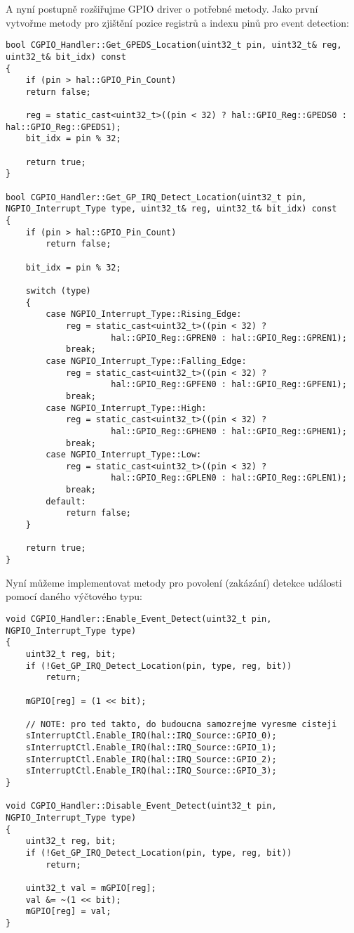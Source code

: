 \documentclass{article}
\begin{document}
A nyní postupně rozšiřujme GPIO driver o potřebné metody. Jako první vytvořme metody pro zjištění pozice registrů a indexu pinů pro event detection:
\begin{lstlisting}
bool CGPIO_Handler::Get_GPEDS_Location(uint32_t pin, uint32_t& reg, uint32_t& bit_idx) const
{
	if (pin > hal::GPIO_Pin_Count)
	return false;
	
	reg = static_cast<uint32_t>((pin < 32) ? hal::GPIO_Reg::GPEDS0 : hal::GPIO_Reg::GPEDS1);
	bit_idx = pin % 32;
	
	return true;
}

bool CGPIO_Handler::Get_GP_IRQ_Detect_Location(uint32_t pin, NGPIO_Interrupt_Type type, uint32_t& reg, uint32_t& bit_idx) const
{
	if (pin > hal::GPIO_Pin_Count)
		return false;
	
	bit_idx = pin % 32;
	
	switch (type)
	{
		case NGPIO_Interrupt_Type::Rising_Edge:
			reg = static_cast<uint32_t>((pin < 32) ?
					 hal::GPIO_Reg::GPREN0 : hal::GPIO_Reg::GPREN1);
			break;
		case NGPIO_Interrupt_Type::Falling_Edge:
			reg = static_cast<uint32_t>((pin < 32) ?
					 hal::GPIO_Reg::GPFEN0 : hal::GPIO_Reg::GPFEN1);
			break;
		case NGPIO_Interrupt_Type::High:
			reg = static_cast<uint32_t>((pin < 32) ?
					 hal::GPIO_Reg::GPHEN0 : hal::GPIO_Reg::GPHEN1);
			break;
		case NGPIO_Interrupt_Type::Low:
			reg = static_cast<uint32_t>((pin < 32) ?
					 hal::GPIO_Reg::GPLEN0 : hal::GPIO_Reg::GPLEN1);
			break;
		default:
			return false;
	}
	
	return true;
}
\end{lstlisting}

Nyní můžeme implementovat metody pro povolení (zakázání) detekce události pomocí daného výčtového typu:
\begin{lstlisting}
void CGPIO_Handler::Enable_Event_Detect(uint32_t pin, NGPIO_Interrupt_Type type)
{
	uint32_t reg, bit;
	if (!Get_GP_IRQ_Detect_Location(pin, type, reg, bit))
		return;
	
	mGPIO[reg] = (1 << bit);
	
	// NOTE: pro ted takto, do budoucna samozrejme vyresme cisteji
	sInterruptCtl.Enable_IRQ(hal::IRQ_Source::GPIO_0);
	sInterruptCtl.Enable_IRQ(hal::IRQ_Source::GPIO_1);
	sInterruptCtl.Enable_IRQ(hal::IRQ_Source::GPIO_2);
	sInterruptCtl.Enable_IRQ(hal::IRQ_Source::GPIO_3);
}

void CGPIO_Handler::Disable_Event_Detect(uint32_t pin, NGPIO_Interrupt_Type type)
{
	uint32_t reg, bit;
	if (!Get_GP_IRQ_Detect_Location(pin, type, reg, bit))
		return;
	
	uint32_t val = mGPIO[reg];
	val &= ~(1 << bit);
	mGPIO[reg] = val;
}
\end{lstlisting}
\end{document}
